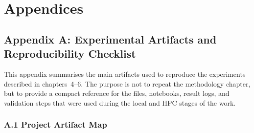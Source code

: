 \chapter*{Appendices}
{}

\section*{Appendix A: Experimental Artifacts and Reproducibility Checklist}

This appendix summarises the main artifacts used to reproduce the experiments described in chapters~4--6. The purpose is not to repeat the methodology chapter, but to provide a compact reference for the files, notebooks, result logs, and validation steps that were used during the local and \ac{HPC} stages of the work.

\subsection*{A.1 Project Artifact Map}

